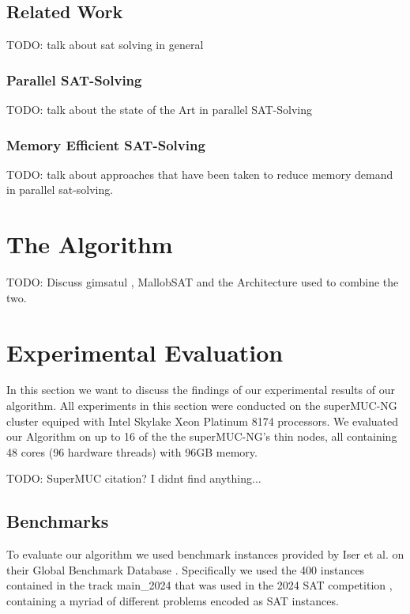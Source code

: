 \documentclass[12pt,a4paper,twoside]{scrartcl}
\numberwithin{equation}{section}
\begin{document}
\subsection{Related Work}

TODO: talk about sat solving in general

\subsubsection{Parallel SAT-Solving}

TODO: talk about the state of the Art in parallel SAT-Solving

\subsubsection{Memory Efficient SAT-Solving}

TODO: talk about approaches that have been taken to reduce memory demand in parallel sat-solving.


\section{The Algorithm}

TODO: Discuss gimsatul \cite{gimsatul}, MallobSAT \cite{dominikPhd} and the Architecture used to combine the two.


\newpage
\section{Experimental Evaluation}

In this section we want to discuss the findings of our experimental results of our algorithm. All experiments in this section were conducted on the superMUC-NG cluster equiped with Intel Skylake Xeon Platinum 8174 processors. We evaluated our Algorithm on up to 16 of the the superMUC-NG's thin nodes, all containing 48 cores (96 hardware threads) with 96GB memory.

TODO: SuperMUC citation? I didnt find anything...

\subsection{Benchmarks}
To evaluate our algorithm we used benchmark instances provided by Iser et al. on their Global Benchmark Database \cite{benchmarkDB}. Specifically we used the 400 instances contained in the track main\_2024 that was used in the 2024 SAT competition \cite{satCompetition}, containing a myriad of different problems encoded as SAT instances.
\end{document}

